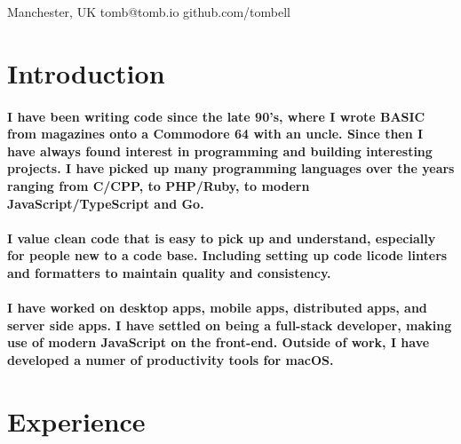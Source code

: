 \maketitle

\begin{center}
  \raisebox{0\height}{\small\faMapMarker} Manchester, UK
  \hspace{1 cm}
  \raisebox{-0.1\height}{\small\faEnvelope} tomb@tomb.io
  \hspace{1 cm}
  \raisebox{-0.1\height}{\small\faGithubAlt} github.com/tombell
\end{center}

\section{Introduction}
\paragraph{I have been writing code since the late 90's, where I wrote BASIC
from magazines onto a Commodore 64 with an uncle. Since then I have always found
interest in programming and building interesting projects. I have picked up many
programming languages over the years ranging from C/CPP, to PHP/Ruby, to modern
JavaScript/TypeScript and Go.}

\paragraph{I value clean code that is easy to pick up and understand, especially
for people new to a code base. Including setting up code licode linters and
formatters to maintain quality and consistency.}

\paragraph{I have worked on desktop apps, mobile apps, distributed apps, and
server side apps. I have settled on being a full-stack developer, making use of
modern JavaScript on the front-end. Outside of work, I have developed a numer of
productivity tools for macOS.}

\section{Experience}

